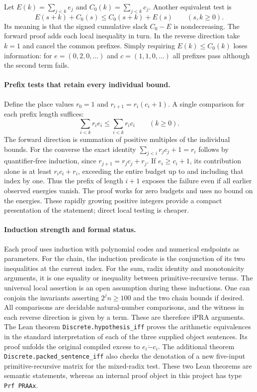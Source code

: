 Let $E(k)=\sum_{j<k}e_j$ and $C_0(k)=\sum_{j<k}c_j$. Another equivalent test is
\[
 E(s+k)+C_0(s)\le C_0(s+k)+E(s)\qquad(s,k\ge0).
\]
Its meaning is that the signed cumulative slack $C_0-E$ is nondecreasing. The forward proof adds each local inequality in turn. In the reverse direction take $k=1$ and cancel the common prefixes. Simply requiring $E(k)\le C_0(k)$ loses information: for $e=(0,2,0,\ldots)$ and $c=(1,1,0,\ldots)$ all prefixes pass although the second term fails.

\paragraph{Prefix tests that retain every individual bound.}
Define the place values $r_0=1$ and $r_{i+1}=r_i(c_i+1)$. A single comparison for each prefix length suffices:
\[
 \sum_{i<k}r_i e_i\le\sum_{i<k}r_i c_i\qquad(k\ge0).
\]
The forward direction is summation of positive multiples of the individual bounds. For the converse the exact identity
$\sum_{j<i}r_j c_j+1=r_i$ follows by quantifier-free induction, since $r_{j+1}=r_j c_j+r_j$. If $e_i\ge c_i+1$, its contribution alone is at least $r_i c_i+r_i$, exceeding the entire budget up to and including that index by one. Thus the prefix of length $i+1$ exposes the failure even if all earlier observed energies vanish. The proof works for zero budgets and uses no bound on the energies. These rapidly growing positive integers provide a compact presentation of the statement; direct local testing is cheaper.

\paragraph{Induction strength and formal status.}
Each proof uses induction with polynomial codes and numerical endpoints as parameters. For the chain, the induction predicate is the conjunction of its two inequalities at the current index. For the sum, radix identity and monotonicity arguments, it is one equality or inequality between primitive-recursive terms. The universal local assertion is an open assumption during these inductions. One can conjoin the invariants asserting $2^jn\ge100$ and the two chain bounds if desired. All comparisons are decidable natural-number comparisons, and the witness in each reverse direction is given by a term. These are therefore iPRA arguments. The Lean theorem \texttt{Discrete.hypothesis\_iff} proves the arithmetic equivalences in the standard interpretation of each of the three supplied object sentences. Its proof unfolds the original compiled excess to $e_i\mathbin{\dot-}c_i$. The additional theorem \texttt{Discrete.packed\_sentence\_iff} also checks the denotation of a new five-input primitive-recursive matrix for the mixed-radix test. These two Lean theorems are semantic statements, whereas an internal proof object in this project has type \texttt{Prf PRAAx}.

